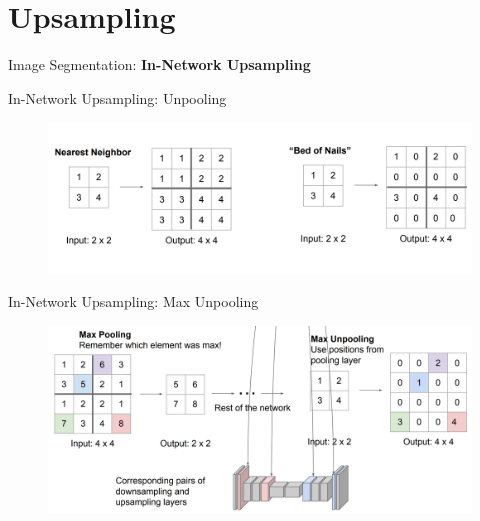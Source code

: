 \section{Upsampling}
\begin{frame}{}
    \LARGE Image Segmentation: \textbf{In-Network Upsampling}
\end{frame}

\begin{frame}{In-Network Upsampling: Unpooling}
    \begin{figure}
        \centering
        \includegraphics[width=1.0\textwidth,height=1.0\textheight,keepaspectratio]{images/segmentation/upsample_1.png}
    \end{figure}
\end{frame}

\begin{frame}{In-Network Upsampling: Max Unpooling}
    \begin{figure}
        \centering
        \includegraphics[width=1.0\textwidth,height=1.0\textheight,keepaspectratio]{images/segmentation/upsample_2.png}
    \end{figure}
\end{frame}

